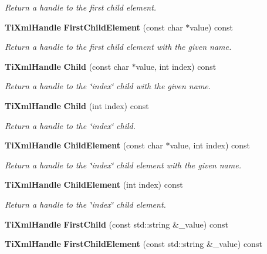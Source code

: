 \begin{CompactItemize}
\begin{CompactList}\small\item\em Return a handle to the first child element. \item\end{CompactList}\item 
{\bf Ti\-Xml\-Handle} {\bf First\-Child\-Element} (const char $\ast$value) const\label{classTiXmlHandle_TiXmlHandlea6}

\begin{CompactList}\small\item\em Return a handle to the first child element with the given name. \item\end{CompactList}\item 
{\bf Ti\-Xml\-Handle} {\bf Child} (const char $\ast$value, int index) const
\begin{CompactList}\small\item\em Return a handle to the \char`\"{}index\char`\"{} child with the given name. \item\end{CompactList}\item 
{\bf Ti\-Xml\-Handle} {\bf Child} (int index) const
\begin{CompactList}\small\item\em Return a handle to the \char`\"{}index\char`\"{} child. \item\end{CompactList}\item 
{\bf Ti\-Xml\-Handle} {\bf Child\-Element} (const char $\ast$value, int index) const
\begin{CompactList}\small\item\em Return a handle to the \char`\"{}index\char`\"{} child element with the given name. \item\end{CompactList}\item 
{\bf Ti\-Xml\-Handle} {\bf Child\-Element} (int index) const
\begin{CompactList}\small\item\em Return a handle to the \char`\"{}index\char`\"{} child element. \item\end{CompactList}\item 
{\bf Ti\-Xml\-Handle} {\bf First\-Child} (const std::string \&\_\-value) const\label{classTiXmlHandle_TiXmlHandlea11}

\item 
{\bf Ti\-Xml\-Handle} {\bf First\-Child\-Element} (const std::string \&\_\-value) const\label{classTiXmlHandle_TiXmlHandlea12}


\end{CompactItemize}
